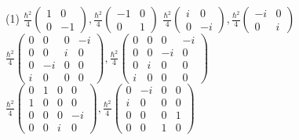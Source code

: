 \begin{enumerate}
\begin{minipage}{\textwidth}
\end{minipage}
\begin{tasks}(1)
	\task[\textbf{A.}]$\frac{\hbar^{2}}{4}\left(\begin{array}{cc}
		1 & 0 \\
		0 & -1
	\end{array}\right), \frac{\hbar^{2}}{4}\left(\begin{array}{rr}
		-1 & 0 \\
		0 & 1
	\end{array}\right)$
	\task[\textbf{B.}]$\frac{\hbar^{2}}{4}\left(\begin{array}{cc}
		i & 0 \\
		0 & -i
	\end{array}\right), \frac{\hbar^{2}}{4}\left(\begin{array}{rr}
		-i & 0 \\
		0 & i
	\end{array}\right)$
	\task[\textbf{C.}]$\frac{\hbar^{2}}{4}\left(\begin{array}{cccc}
		0 & 0 & 0 & -i \\
		0 & 0 & i & 0 \\
		0 & -i & 0 & 0 \\
		i & 0 & 0 & 0
	\end{array}\right), \frac{\hbar^{2}}{4}\left(\begin{array}{cccc}
		0 & 0 & 0 & -i \\
		0 & 0 & -i & 0 \\
		0 & i & 0 & 0 \\
		i & 0 & 0 & 0
	\end{array}\right)$
	\task[\textbf{D.}]$\frac{\hbar^{2}}{4}\left(\begin{array}{cccc}
		0 & 1 & 0 & 0 \\
		1 & 0 & 0 & 0 \\
		0 & 0 & 0 & -i \\
		0 & 0 & i & 0
	\end{array}\right), \frac{\hbar^{2}}{4}\left(\begin{array}{cccc}
		0 & -i & 0 & 0 \\
		i & 0 & 0 & 0 \\
		0 & 0 & 0 & 1 \\
		0 & 0 & 1 & 0
	\end{array}\right)$
\end{tasks}
\end{enumerate}
